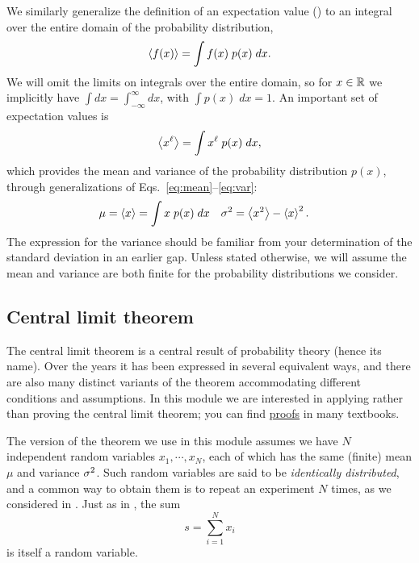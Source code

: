 We similarly generalize the definition of an expectation value () to an integral over the entire domain of the  probability distribution,
\begin{equation*}
  \left\langle f(x) \right\rangle = \int f(x) \; p(x) \; dx.
\end{equation*}
We will omit the limits on integrals over the entire domain, so for $x \in \mathbb R$ we implicitly have $\int dx = \int_{-\infty}^{\infty} dx$, with $\int p(x) \; dx = 1$.
An important set of expectation values is
\begin{equation}
  \label{eq:expect_cont}
  \left\langle x^{\ell} \right\rangle = \int x^{\ell} \; p(x) \; dx,
\end{equation}
which provides the mean and variance of the probability distribution $p(x)$, through generalizations of Eqs.~\ref{eq:mean}--\ref{eq:var}:
\begin{align}
  \label{eq:mean_var}
  \mu   & = \left\langle x \right\rangle = \int x \; p(x) \; dx &
  \sigma^2 & = \left\langle x^2 \right\rangle - \left\langle x \right\rangle^2.
\end{align}
The expression for the variance should be familiar from your determination of the standard deviation in an earlier gap.
Unless stated otherwise, we will assume the mean and variance are both finite for the probability distributions we consider.



\subsection{\label{sec:CLT}Central limit theorem}
The central limit theorem is a central result of probability theory (hence its name).
Over the years it has been expressed in several equivalent ways, and there are also many distinct variants of the theorem accommodating different conditions and assumptions.
In this module we are interested in applying rather than proving the central limit theorem; you can find \href{https://en.wikipedia.org/wiki/Central_limit_theorem#Proof_of_classical_CLT}{proofs} in many textbooks.

The version of the theorem we use in this module assumes we have $N$ independent random variables $x_1, \cdots, x_N$, each of which has the same (finite) mean $\mu$ and variance $\sigma^2$.
Such random variables are said to be \textit{identically distributed}, and a common way to obtain them is to repeat an experiment $N$ times, as we considered in .
Just as in , the sum
\begin{equation}
  \label{eq:CLTsum}
  s = \sum_{i = 1}^N x_i
\end{equation}
is itself a random variable.

